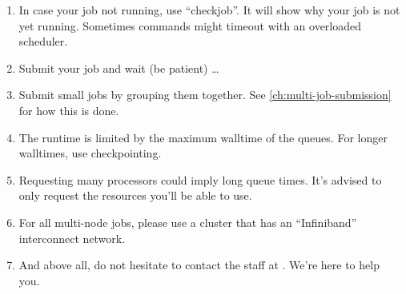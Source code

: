 \begin{enumerate}
  \ifgent
  \else
  \ifbrussel
  \else
  \item  In case your job not running, use ``checkjob''.  It will show why your
    job is not yet running. Sometimes commands might timeout with an overloaded
    scheduler.
  \fi
  \fi

  \item  Submit your job and wait (be patient) \ldots

  \item  Submit small jobs by grouping them together. See \autoref{ch:multi-job-submission}
    for how this is done.

  \item  The runtime is limited by the maximum walltime of the queues. For
    longer walltimes, use checkpointing.

  \item  Requesting many processors could imply long queue times. It's advised
    to only request the resources you'll be able to use.

  \item  For all multi-node jobs, please use a cluster that has an ``Infiniband''
    interconnect network.

  \item  And above all, do not hesitate to contact the \hpc staff at \hpcinfo. We're
    here to help you.
\end{enumerate}
